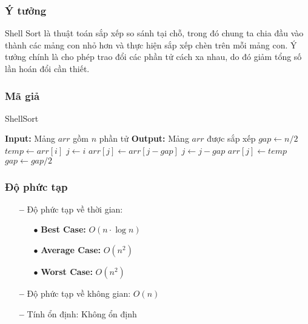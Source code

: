 \subsubsection{Ý tưởng}
Shell Sort là thuật toán sắp xếp so sánh tại chỗ, trong đó chung ta chia đầu vào thành các mảng con nhỏ hơn và thực hiện sắp xếp chèn trên mỗi mảng con. Ý tưởng chính là cho phép trao đổi các phần tử cách xa nhau, do đó giảm tổng số lần hoán đổi cần thiết.

\subsubsection{Mã giả}
\begin{algorithm}[H]
\caption{ShellSort}
\begin{algorithmic}[1]
    \State \textbf{Input:} Mảng $arr$ gồm $n$ phần tử
    \State \textbf{Output:} Mảng $arr$ được sắp xếp
    \State $gap \gets n/2$
            \State $temp \gets arr[i]$
            \State $j \gets i$
                \State $arr[j] \gets arr[j - gap]$
                \State $j \gets j - gap$
            \EndWhile
            \State $arr[j] \gets temp$
        \EndFor
        \State $gap \gets gap / 2$
    \EndWhile
\EndProcedure
\end{algorithmic}
\end{algorithm}

\subsubsection{Độ phức tạp}
\begin{itemize}
    \item[\textbf{--}]Độ phức tạp về thời gian:
        \begin{itemize}
            \item[$\bullet$] \textbf{Best Case:} $O(n \cdot \log{n})$
            \item[$\bullet$] \textbf{Average Case:}  $O(n^2)$
            \item[$\bullet$] \textbf{Worst Case:}  $O(n^2)$
        \end{itemize}
    \item[\textbf{--}]Độ phức tạp về không gian: $O(n)$ 
    \item[\textbf{--}]Tính ổn định: Không ổn định
\end{itemize}